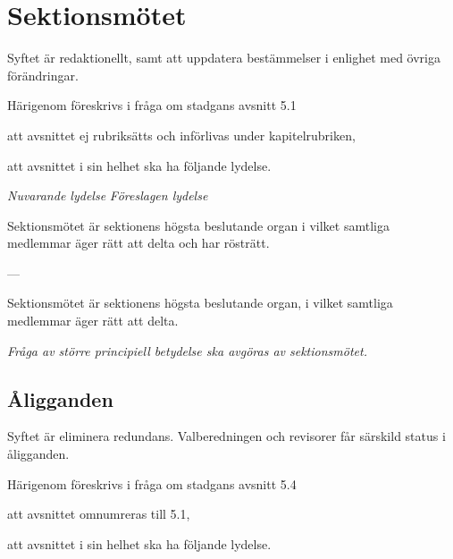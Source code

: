 \documentclass{article}
\newenvironment{lydelse}
    {\begin{paracol}{2}%
        \emph{Nuvarande lydelse}%
        \switchcolumn%
        \emph{Föreslagen lydelse}%
    \end{paracol}%
    \begin{enumerate}[label=\thesubsection.\arabic*]%
    \begin{paracol}{2}%
    }{\end{paracol}\end{enumerate}}
\begin{document}
\section{Sektionsmötet}
Syftet är redaktionellt, samt att uppdatera bestämmelser i enlighet med övriga förändringar.

Härigenom föreskrivs i fråga om stadgans avsnitt 5.1
\begin{dels}
    \item att avsnittet ej rubriksätts och införlivas under kapitelrubriken,
    \item att avsnittet i sin helhet ska ha följande lydelse.
\end{dels}

\begin{lydelse}
  \setcounter{subsection}{1}
    \item Sektionsmötet är sektionens högsta beslutande organ i vilket samtliga medlemmar äger rätt att delta och har rösträtt.

    \item[] ---
  \switchcolumn
  \setcounter{subsection}{0}
  \setcounter{enumi}{0}
    \item Sektionsmötet är sektionens högsta beslutande organ, i vilket samtliga medlemmar äger rätt att delta.

    \item \emph{Fråga av större principiell betydelse ska avgöras av sektionsmötet.}

\end{lydelse}

\setcounter{subsection}{0}
\subsection{Åligganden}
Syftet är eliminera redundans.
Valberedningen och revisorer får särskild status i åligganden.

Härigenom föreskrivs i fråga om stadgans avsnitt 5.4
\begin{dels}
    \item att avsnittet omnumreras till 5.1,
    \item att avsnittet i sin helhet ska ha följande lydelse.
\end{dels}
\end{document}
